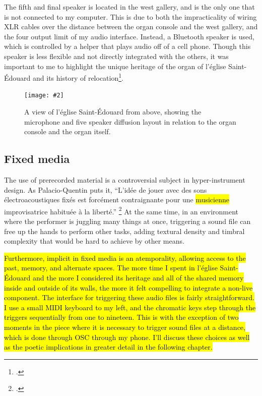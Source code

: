 \documentclass[12pt,twoside,maitrise]{dms_ks}
\newcommand{\customincludegraphics}[4][]{%
    \begin{figure}[H]
        \centering
        \texttt{[image: \#2]}
        \caption{#4}
	\label{#3} 
    \end{figure}
}
\theoremstyle{definition}
\begin{document}
{{{The fifth and final speaker is located in the west gallery, and is the only one that is not connected to my computer.
This is due to both the impracticality of wiring XLR cables over the distance between the organ console and the west gallery, and the four output limit of my audio interface.
Instead, a Bluetooth speaker is used, which is controlled by a helper that plays audio off of a cell phone.
Though this speaker is less flexible and not directly integrated with the others, it was important to me to highlight the unique heritage of the organ of l'église Saint-Édouard and its history of relocation}\footcite{noauthor_eglise_nodate}. 


\customincludegraphics[scale=0.5]{stageplot_ste-edouard.png}{fig:stageplot}{A view of l'église Saint-Édouard from above, showing the microphone and five speaker diffusion layout in relation to the organ console and the organ itself.}

\subsection{Fixed media}

The use of prerecorded material is a controversial subject in hyper-instrument design.
As Palacio-Quentin puts it, “L’idée de jouer avec des sons électroacoustiques fixés est forcément contraignante pour une \hl{musicienne} improvisatrice habituée à la liberté.” \footcite[50]{palacio-quintin_composition_2012-1}
At the same time, in an environment where the performer is juggling many things at once, triggering a sound file can free up the hands to perform other tasks, adding textural density and timbral complexity that would be hard to achieve by other means. 


\hl{Furthermore, implicit in fixed media is an atemporality, allowing access to the past, memory, and alternate spaces.
The more time I spent in l'église Saint-Édouard and the more I considered its heritage and all of the shared memory inside and outside of its walls, the more it felt compelling to integrate a non-live component.
The interface for triggering these audio files is fairly straightforward.
I use a small MIDI keyboard to my left, and the chromatic keys step through the triggers sequentially from one to nineteen. 
This is with the exception of two moments in the piece where it is necessary to trigger sound files at a distance, which is done through OSC through my phone.
I'll discuss these choices as well as the poetic implications in greater detail in the following chapter.}

}}
\end{document}
